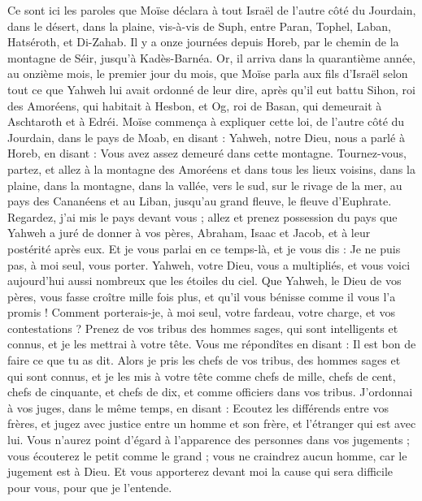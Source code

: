 \begin{multicols}{2}
\VerseOne{}Ce sont ici les paroles que Moïse déclara à tout Israël de l’autre côté du Jourdain, dans le désert, dans la plaine, vis-à-vis de Suph, entre Paran, Tophel, Laban, Hatséroth, et Di-Zahab.
Il y a onze journées depuis Horeb, par le chemin de la montagne de Séir, jusqu'à Kadès-Barnéa.
Or, il arriva dans la quarantième année, au onzième mois, le premier jour du mois, que Moïse parla aux fils d'Israël selon tout ce que Yahweh lui avait ordonné de leur dire,
après qu'il eut battu Sihon, roi des Amoréens, qui habitait à Hesbon, et Og, roi de Basan, qui demeurait à Aschtaroth et à Edréi.
Moïse commença à expliquer cette loi, de l’autre côté du Jourdain, dans le pays de Moab, en disant :
Yahweh, notre Dieu, nous a parlé à Horeb, en disant : Vous avez assez demeuré dans cette montagne.
Tournez-vous, partez, et allez à la montagne des Amoréens et dans tous les lieux voisins, dans la plaine, dans la montagne, dans la vallée, vers le sud, sur le rivage de la mer, au pays des Cananéens et au Liban, jusqu'au grand fleuve, le fleuve d'Euphrate.
Regardez, j'ai mis le pays devant vous ; allez et prenez possession du pays que Yahweh a juré de donner à vos pères, Abraham, Isaac et Jacob, et à leur postérité après eux.
Et je vous parlai en ce temps-là, et je vous dis : Je ne puis pas, à moi seul, vous porter.
Yahweh, votre Dieu, vous a multipliés, et vous voici aujourd'hui aussi nombreux que les étoiles du ciel.
Que Yahweh, le Dieu de vos pères, vous fasse croître mille fois plus, et qu’il vous bénisse comme il vous l'a promis !
Comment porterais-je, à moi seul, votre fardeau, votre charge, et vos contestations ?
Prenez de vos tribus des hommes sages, qui sont intelligents et connus, et je les mettrai à votre tête.
Vous me répondîtes en disant : Il est bon de faire ce que tu as dit.
Alors je pris les chefs de vos tribus, des hommes sages et qui sont connus, et je les mis à votre tête comme chefs de mille, chefs de cent, chefs de cinquante, et chefs de dix, et comme officiers dans vos tribus.
J’ordonnai à vos juges, dans le même temps, en disant : Ecoutez les différends entre vos frères, et jugez avec justice entre un homme et son frère, et l'étranger qui est avec lui.
Vous n'aurez point d'égard à l'apparence des personnes dans vos jugements ; vous écouterez le petit comme le grand ; vous ne craindrez aucun homme, car le jugement est à Dieu. Et vous apporterez devant moi la cause qui sera difficile pour vous, pour que je l’entende.

\end{multicols}
